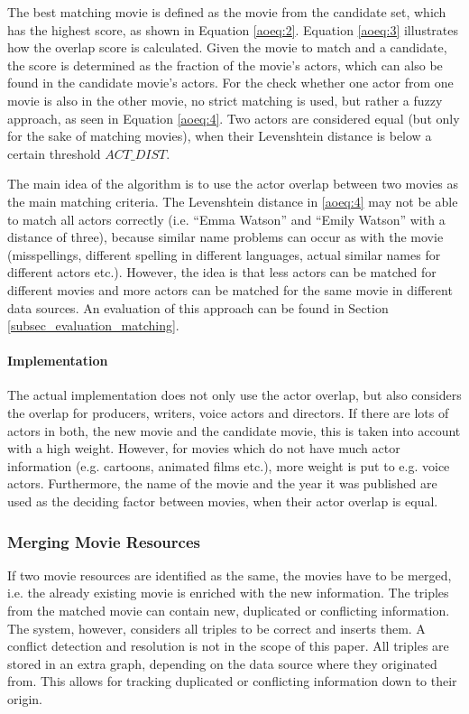 The best matching movie is defined as the movie from the candidate set, which has the highest score, as shown in Equation \ref{aoeq:2}.
Equation \ref{aoeq:3} illustrates how the overlap score is calculated. Given the movie to match and a candidate, the score is determined as the fraction of the movie's actors, which can also be found in the candidate movie's actors.
For the check whether one actor from one movie is also in the other movie, no strict matching is used, but rather a fuzzy approach, as seen in Equation \ref{aoeq:4}.
Two actors are considered equal (but only for the sake of matching movies), when their Levenshtein distance is below a certain threshold $ACT\_DIST$.

The main idea of the algorithm is to use the actor overlap between two movies as the main matching criteria.
The Levenshtein distance in \ref{aoeq:4} may not be able to match all actors correctly (i.e. ``Emma Watson'' and ``Emily Watson'' with a distance of three), because similar name problems can occur as with the movie (misspellings, different spelling in different languages, actual similar names for different actors etc.).
However, the idea is that less actors can be matched for different movies and more actors can be matched for the same movie in different data sources.
An evaluation of this approach can be found in Section \ref{subsec_evaluation_matching}.

\paragraph{Implementation}
The actual implementation does not only use the actor overlap, but also considers the overlap for producers, writers, voice actors and directors.
If there are lots of actors in both, the new movie and the candidate movie, this is taken into account with a high weight.
However, for movies which do not have much actor information (e.g. cartoons, animated films etc.), more weight is put to e.g. voice actors.
Furthermore, the name of the movie and the year it was published are used as the deciding factor between movies, when their actor overlap is equal.

\subsubsection{Merging Movie Resources}

If two movie resources are identified as the same, the movies have to be merged, i.e. the already existing movie is enriched with the new information.
The triples from the matched movie can contain new, duplicated or conflicting information.
The system, however, considers all triples to be correct and inserts them.
A conflict detection and resolution is not in the scope of this paper.
All triples are stored in an extra graph, depending on the data source where they originated from.
This allows for tracking duplicated or conflicting information down to their origin.
